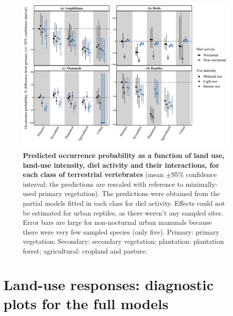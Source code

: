 \begin{figure}[h!]
\centering
\includegraphics[scale=0.7]{Supporting/Chapter4/Figures/Partial_models_predictions/Diel_activity}
\caption[Predicted occurrence probability as a function of land use, land-use intensity, diel activity and their interactions in each class]{\textbf{Predicted occurrence probability as a function of land use, land-use intensity, diel activity and their interactions, for each class of terrestrial vertebrates} (mean $\pm$95\% confidence interval; the predictions are rescaled with reference to minimally-used primary vegetation). The predictions were obtained from the partial models fitted in each class for diel activity. Effects could not be estimated for urban reptiles, as there weren't any sampled sites. Error bars are large for non-nocturnal urban mammals because there were very few sampled species (only five).  Primary: primary vegetation; Secondary: secondary vegetation; plantation: plantation forest; agricultural: cropland and pasture.}
\label{SI_4_Figure11}
\end{figure}


\clearpage
\section{Land-use responses: diagnostic plots for the full models} 


